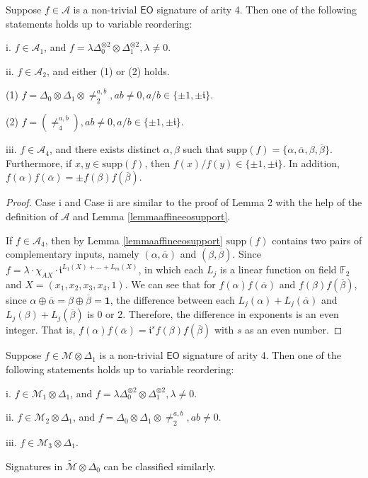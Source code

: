 \documentclass[a4paper,UKenglish,cleveref, autoref, thm-restate]{lipics-v2021}
\newcommand{\eo}[0]{\textsf{EO}}
\newcommand{\su}[0]{\text{supp}}
\begin{document}
\begin{lemma}\label{lem:arity4inA}
Suppose $f\in \mathscr{A}$ is a non-trivial $\eo$ signature of arity 4. Then one of the following statements holds up to variable reordering:

i. $f\in\mathscr{A}_1$, and $f=\lambda\Delta_0^{\otimes2}\otimes\Delta_1^{\otimes2},\lambda\neq0$. 

ii. $f\in\mathscr{A}_2$, and either (1) or (2) holds.

(1) $f=\Delta_0\otimes\Delta_1\otimes\neq_2^{a,b}, ab\neq0, a/b\in\{\pm1,\pm\mathfrak{i}\}$.

(2) $f=(\neq_4^{a,b}), ab\neq0, a/b\in\{\pm1,\pm\mathfrak{i}\}$.

iii. $f\in\mathscr{A}_4$, and there exists distinct $\alpha,\beta$ such that  $\su(f)=\{\alpha,\overline{\alpha},\beta,\overline{\beta}\}$. Furthermore, if $x,y\in\su(f)$, then $f(x)/f(y)\in\{\pm1,\pm\mathfrak{i}\}$. In addition, $f(\alpha)f(\overline{\alpha})=\pm f(\beta)f(\overline{\beta})$.

\end{lemma}

\begin{proof}
Case i and Case ii are similar to the proof of Lemma 2 with the help of the definition of $\mathscr{A}$ and Lemma \ref{lemmaaffineeosupport}.

If $f\in\mathscr{A}_4$, then by Lemma \ref{lemmaaffineeosupport} $\su(f)$ contains two pairs of complementary inputs, namely $(\alpha,\overline{\alpha})$ and $(\beta,\overline{\beta})$. Since $f=\lambda \cdot\chi_{AX} \cdot\mathfrak i^{L_1(X)+...+L_m(X)}$, in which each $L_j$ is a linear function on field $\mathbb{F}_2$ and $X=(x_1,x_2,x_3,x_4,1)$. We can see that for $f(\alpha)f(\overline{\alpha})$ and $f(\beta)f(\overline{\beta})$, since $\alpha\oplus\overline\alpha=\beta\oplus\overline\beta=\mathbf{1}$, the difference between each $L_j(\alpha)+L_j(\overline\alpha)$ and $L_j(\beta)+L_j(\overline\beta)$ is 0 or 2. Therefore, the difference in exponents is an even integer. That is, $f(\alpha)f(\overline{\alpha})=\mathfrak i^sf(\beta)f(\overline{\beta})$ with $s$ as an even number.
\end{proof}

\begin{lemma}\label{lem:arity4inM}
Suppose $f\in \mathscr{M}\otimes\Delta_1$ is a non-trivial $\eo$ signature of arity 4. Then one of the following statements holds up to variable reordering:

i. $f\in\mathscr{M}_1\otimes\Delta_1$, and $f=\lambda\Delta_0^{\otimes2}\otimes\Delta_1^{\otimes2},\lambda\neq0$. 


ii. $f\in\mathscr{M}_2\otimes\Delta_1$, and $f=\Delta_0\otimes\Delta_1\otimes\neq_2^{a,b}, ab\neq0$.

iii. $f\in\mathscr{M}_3\otimes\Delta_1$.

Signatures in $\widetilde{\mathscr{M}}\otimes\Delta_0$ can be classified similarly.
\end{lemma}
\end{document}
